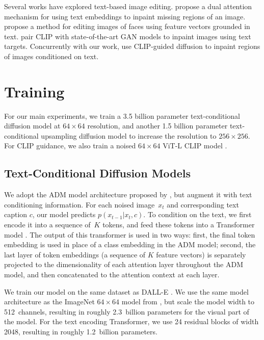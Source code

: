Several works have explored text-based image editing. \citet{textinpainting} propose a dual attention mechanism for using text embeddings to inpaint missing regions of an image. \citet{textstylegan} propose a method for editing images of faces using feature vectors grounded in text. \citet{paintbyword} pair CLIP with state-of-the-art GAN models to inpaint images using text targets. Concurrently with our work, \citet{blendeddiff} use CLIP-guided diffusion to inpaint regions of images conditioned on text.

\section{Training}

For our main experiments, we train a 3.5 billion parameter text-conditional diffusion model at $64 \times 64$ resolution, and another 1.5 billion parameter text-conditional upsampling diffusion model to increase the resolution to $256 \times 256$. For CLIP guidance, we also train a noised $64 \times 64$ ViT-L CLIP model \citep{vit}.

\subsection{Text-Conditional Diffusion Models}

We adopt the ADM model architecture proposed by \citet{sotapaper}, but augment it with text conditioning information. For each noised image~$x_t$ and corresponding text caption $c$, our model predicts $p(x_{t-1}|x_t, c)$. To condition on the text, we first encode it into a sequence of~$K$ tokens, and feed these tokens into a Transformer model \citep{transformer}. The output of this transformer is used in two ways: first, the final token embedding is used in place of a class embedding in the ADM model; second, the last layer of token embeddings (a sequence of $K$ feature vectors) is separately projected to the dimensionality of each attention layer throughout the ADM model, and then concatenated to the attention context at each layer.

We train our model on the same dataset as DALL-E \citep{dalle}. We use the same model architecture as the ImageNet $64 \times 64$ model from \citet{sotapaper}, but scale the model width to 512~channels, resulting in roughly 2.3~billion parameters for the visual part of the model. For the text encoding Transformer, we use 24 residual blocks of width 2048, resulting in roughly 1.2~billion parameters.

